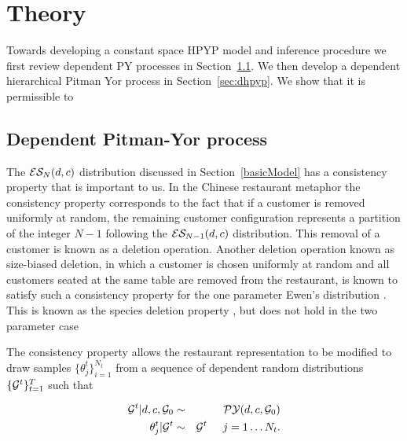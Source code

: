 \section{Theory}
\label{sec:theory}

Towards developing a constant space HPYP model and inference procedure we first review dependent PY processes in Section~\ref{sec:dpyp}.  We then develop a dependent hierarchical Pitman Yor process in Section~\ref{sec:dhpyp}.  We show that it is permissible to 



\subsection{Dependent Pitman-Yor process} 
\label{sec:dpyp}

The $\ES_N(d,c)$ distribution discussed in Section~\ref{basicModel} has a consistency property that is important to us. In the Chinese restaurant metaphor the consistency property corresponds to the fact that if a customer is removed uniformly at random, the remaining customer configuration represents a partition of the integer $N-1$ following the $\ES_{N-1}(d,c)$ distribution.  \cite{???}  This removal of a customer is known as a deletion operation.  Another deletion operation known as size-biased deletion, in which a customer is chosen uniformly at random and all customers seated at the same table are removed from the restaurant, is known to satisfy such a consistency property for the one parameter Ewen's distribution \cite{kingman}.  This is known as the species deletion property \cite{kingman}, but does not hold in the two parameter case \cite{pitman}

The consistency property allows the restaurant representation to be modified to draw samples  $\{ \theta_j^t \}_{i = 1}^{N_t}$ from a sequence of dependent random distributions $\{ \G^t \}_{t=1}^T$ such that 

\begin{eqnarray}
 \label{eqnDependentPY1}  \G^t | d, c, \G_0 &\sim& \PY(d,c,\G_0)\\
 \label{eqnDependentPY2}  \theta_j^t | \G^t &\sim& \G^t \hspace{.5cm} j = 1 \dots N_t.
 \end{eqnarray}
 

